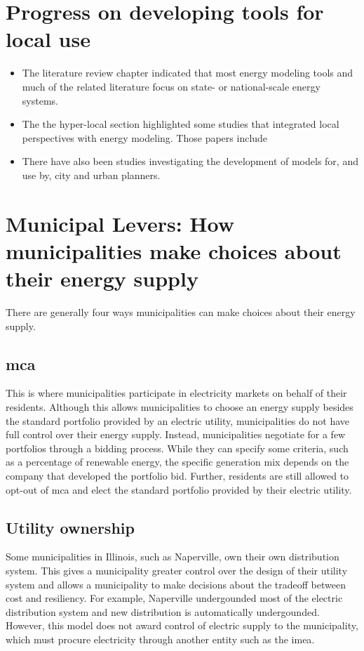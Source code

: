 \section{Progress on developing tools for local use}

\begin{itemize}
    \item The literature review chapter indicated that most energy modeling tools
    and much of the related literature focus on state- or national-scale energy
    systems.
    \item The the hyper-local section highlighted some studies that integrated
    local perspectives with energy modeling. Those papers include 
    \cite{mckenna_combining_2018, johannsen_municipal_2023, fleischhacker_portfolio_2019}
    \item There have also been studies investigating the development of models for, and
    use by, city and urban planners.
\end{itemize}

\section{Municipal Levers: How municipalities make choices about their energy supply}
There are generally four ways municipalities can make choices about their energy supply.

\subsection{\ac{mca}}
This is where municipalities participate in electricity markets on behalf of
their residents. Although this allows municipalities to choose an energy supply
besides the standard portfolio provided by an electric utility, municipalities
do not have full control over their energy supply. Instead, municipalities
negotiate for a few portfolios through a bidding process. While they can specify
some criteria, such as a percentage of renewable energy, the specific generation
mix depends on the company that developed the portfolio bid. Further, residents
are still allowed to opt-out of \ac{mca} and elect the standard portfolio
provided by their electric utility.

\subsection{Utility ownership}
Some municipalities in Illinois, such as Naperville, own their own distribution
system. This gives a municipality greater control over the design of their
utility system and allows a municipality to make decisions about the tradeoff
between cost and resiliency. For example, Naperville undergounded most of the
electric distribution system and new distribution is automatically undergounded.
However, this model does not award control of electric supply to the
municipality, which must procure electricity through another entity such as the
\acf{imea}.

